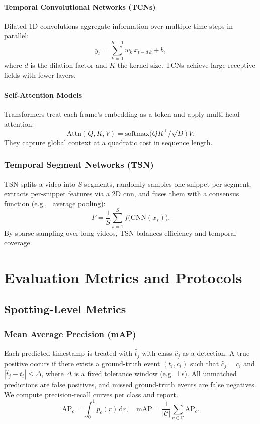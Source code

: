 \paragraph{Temporal Convolutional Networks (TCNs)}  
Dilated 1D convolutions aggregate information over multiple time steps in parallel:
\[
y_t = \sum_{k=0}^{K-1} w_k\,x_{t - d\,k} + b,
\]
where \(d\) is the dilation factor and \(K\) the kernel size. TCNs achieve large receptive fields with fewer layers.

\paragraph{Self-Attention Models}  
Transformers treat each frame's embedding as a token and apply multi-head attention:
\[
\mathrm{Attn}(Q,K,V) = \mathrm{softmax}\bigl(QK^\top/\sqrt{D}\bigr)\,V.
\]
They capture global context at a quadratic cost in sequence length.

\subsubsection{Temporal Segment Networks (TSN)}  
TSN splits a video into \(S\) segments, randomly samples one snippet per segment, extracts per-snippet features via a 2D \acrshort{cnn}, and fuses them with a consensus function (e.g., \ average pooling):
\[
F = \frac{1}{S}\sum_{s=1}^{S}f\bigl(\mathrm{CNN}(x_s)\bigr).
\]
By sparse sampling over long videos, TSN balances efficiency and temporal coverage.

\section{Evaluation Metrics and Protocols}
\label{sec:evaluation}

\subsection{Spotting-Level Metrics}
\subsubsection{Mean Average Precision (mAP)}
Each predicted timestamp is treated with $\hat t_j$ with class $\hat c_j$ as a detection. A true positive occurs if there exists a ground-truth event $(t_i,c_i)$ such that $\hat c_j = c_i$ and $|\hat t_j - t_i|\le\Delta$, where $\Delta$ is a fixed tolerance window (e.g.\ 1\,s). All unmatched predictions are false positives, and missed ground-truth events are false negatives. We compute precision-recall curves per class and report.
\[
\mathrm{AP}_c = \int_{0}^{1} p_c(r)\,\mathrm{d}r,\quad
\mathrm{mAP} = \frac{1}{|\mathcal{C}|}\sum_{c\in\mathcal{C}}\mathrm{AP}_c.
\]

